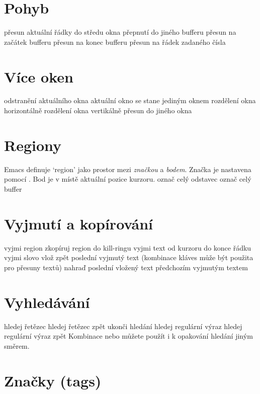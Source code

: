 \section{Pohyb}

 přesun aktuální řádky do středu okna
 přepnutí do jiného bufferu
 přesun na začátek bufferu
 přesun na konec bufferu
 přesun na řádek zadaného čísla

\section{Více oken}

 odstranění aktuálního okna
 aktuální okno se stane jediným oknem
 rozdělení okna horizontálně
 rozdělení okna vertikálně
 přesun do jiného okna

\section{Regiony}

Emacs definuje `region' jako prostor mezi {\it značkou\/} a
{\it bodem}. Značka je nastavena pomocí .
Bod je v místě aktuální pozice kurzoru.
\askip
{} označ celý odstavec
 označ celý buffer

\section{Vyjmutí a kopírování}

 vyjmi region
 zkopíruj region do kill-ringu
 vyjmi text od kurzoru do konce řádku
 vyjmi slovo
 vlož zpět poslední vyjmutý text (kombinace kláves 
          může být použita pro přesuny textů)
 nahraď poslední vložený text předchozím vyjmutým textem

\section{Vyhledávání}

 hledej řetězec
 hledej řetězec zpět
 ukonči hledání
 hledej regulární výraz
 hledej regulární výraz zpět
\askip
Kombinace  nebo  můžete použít i k opakování hledání
jiným směrem.

\section{Značky (tags)}

